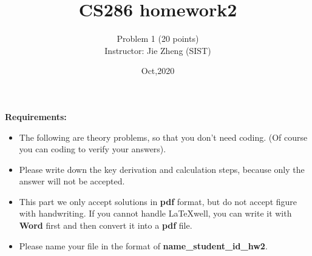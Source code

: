 \documentclass{article}
\title{CS286 homework2}
\author{
Problem 1 (20 points)\\
Instructor: Jie Zheng (SIST)}
\date{Oct,2020}
\begin{document}
\maketitle
\textbf{Requirements:}
\begin{itemize}
    \item The following are theory problems, so that you don't need coding. (Of course you can coding to verify your answers). 
    \item Please write down the key derivation and calculation steps, because only the answer will not be accepted.
    \item This part we only accept solutions in \textbf{pdf} format, but do not accept figure with handwriting. If you cannot handle \LaTeX well, you can write it with \textbf{Word} first and then convert it into a \textbf{pdf} file.
    \item Please name your file in the format of \textbf{name\_student\_id\_hw2}.
\end{itemize} 
\vspace{8ex}
\end{document}
